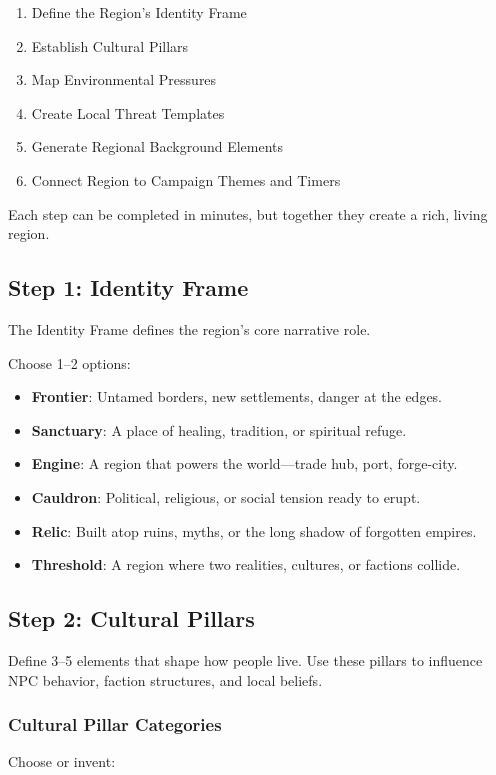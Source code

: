 \documentclass[11pt]{article}
\begin{document}
\begin{enumerate}
    \item Define the Region's Identity Frame
    \item Establish Cultural Pillars
    \item Map Environmental Pressures
    \item Create Local Threat Templates
    \item Generate Regional Background Elements
    \item Connect Region to Campaign Themes and Timers
\end{enumerate}

Each step can be completed in minutes, but together they create a rich, living region.

\subsection{Step 1: Identity Frame}
The Identity Frame defines the region's core narrative role.

Choose 1--2 options:

\begin{itemize}
    \item \textbf{Frontier}: Untamed borders, new settlements, danger at the edges.
    \item \textbf{Sanctuary}: A place of healing, tradition, or spiritual refuge.
    \item \textbf{Engine}: A region that powers the world---trade hub, port, forge-city.
    \item \textbf{Cauldron}: Political, religious, or social tension ready to erupt.
    \item \textbf{Relic}: Built atop ruins, myths, or the long shadow of forgotten empires.
    \item \textbf{Threshold}: A region where two realities, cultures, or factions collide.
\end{itemize}

\subsection{Step 2: Cultural Pillars}
Define 3--5 elements that shape how people live. Use these pillars to influence NPC behavior, 
faction structures, and local beliefs.

\subsubsection{Cultural Pillar Categories}
Choose or invent:
\end{document}
